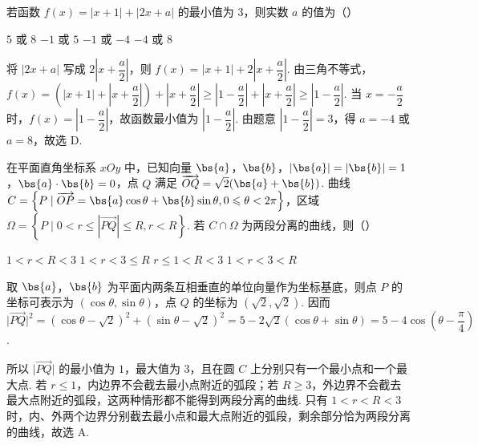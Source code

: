 \begin{problem}
若函数 \( f(x) = |x + 1| + |2x + a| \) 的最小值为 3，则实数 \( a \) 的值为（\quad）

\choices
    {\(5\) 或 \(8\)}
    {\(-1\) 或 \(5\)}
    {\(-1\) 或 \(-4\)}
    {\(-4\) 或 \(8\)}

\begin{solution}
将 \(\lvert2x+a\rvert\) 写成 \(2\left\lvert x+\dfrac a2\right\rvert\)，则 \(f(x)=\lvert x+1\rvert+2\left\lvert x+\dfrac a2\right\rvert\). 由三角不等式，
\(f(x)=\left(\lvert x+1\rvert+\left\lvert x+\dfrac a2\right\rvert\right)+\left\lvert x+\dfrac a2\right\rvert\geqslant\left\lvert1-\dfrac a2\right\rvert+\left\lvert x+\dfrac a2\right\rvert\geqslant\left\lvert1-\dfrac a2\right\rvert\). 当 \(x=-\dfrac a2\) 时，\(f(x)=\left\lvert1-\dfrac a2\right\rvert\)，故函数最小值为 \(\left\lvert1-\dfrac a2\right\rvert\). 由题意 \(\left\lvert1-\dfrac a2\right\rvert=3\)，得 \(a=-4\) 或 \(a=8\)，故选 D.
\end{solution}
\end{problem}

\begin{problem}
在平面直角坐标系 \(xOy\) 中，已知向量 \(\bs{a}\)，\(\bs{b}\)，\(|\bs{a}| = |\bs{b}| = 1\)，\(\bs{a} \cdot \bs{b} = 0\)，点 \(Q\) 满足 \(\overrightarrow{OQ} = \sqrt{2}(\bs{a} + \bs{b})\). 曲线 \(C = \left\{P \mid \overrightarrow{OP} = \bs{a} \cos \theta + \bs{b} \sin \theta, 0 \leqslant \theta < 2\pi\right\}\)，区域 \(\Omega = \left\{P \mid 0 < r \leqslant \left|\overrightarrow{PQ}\right| \leqslant R, r < R\right\}\). 若 \(C \cap \Omega\) 为两段分离的曲线，则（\quad）

\choices
    {\(1 < r < R < 3\)}
    {\(1 < r < 3 \leqslant R\)}
    {\(r \leqslant 1 < R < 3\)}
    {\(1 < r < 3 < R\)}

\begin{solution}
取 \(\bs{a}\)，\(\bs{b}\) 为平面内两条互相垂直的单位向量作为坐标基底，则点 \(P\) 的坐标可表示为 \((\cos\theta,\sin\theta)\)，点 \(Q\) 的坐标为 \((\sqrt{2},\sqrt{2})\). 因而 \(\lvert\overrightarrow{PQ}\rvert^{2}=(\cos\theta-\sqrt{2})^{2}+(\sin\theta-\sqrt{2})^{2}=5-2\sqrt{2}(\cos\theta+\sin\theta)=5-4\cos\left(\theta-\dfrac{\pi}{4}\right)\).

所以 \(\lvert\overrightarrow{PQ}\rvert\) 的最小值为 \(1\)，最大值为 \(3\)，且在圆 \(C\) 上分别只有一个最小点和一个最大点. 若 \(r\leqslant1\)，内边界不会截去最小点附近的弧段；若 \(R\geqslant3\)，外边界不会截去最大点附近的弧段，这两种情形都不能得到两段分离的曲线. 只有 \(1<r<R<3\) 时，内、外两个边界分别截去最小点和最大点附近的弧段，剩余部分恰为两段分离的曲线，故选 A.
\end{solution}
\end{problem}


